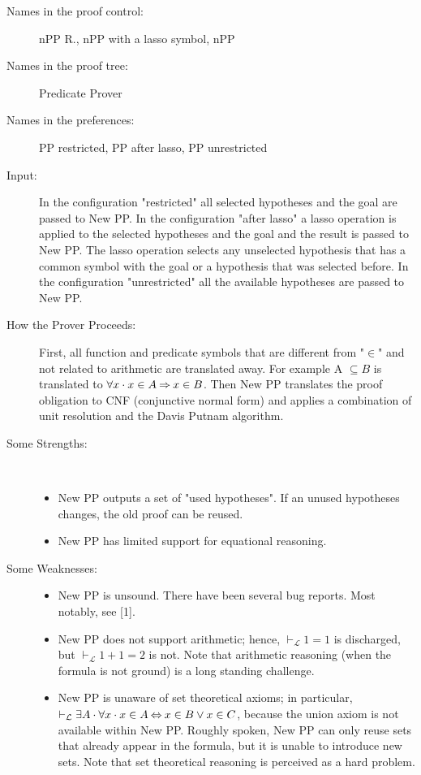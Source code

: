 \begin{description}
	\item[Names in the proof control:] nPP R., nPP with a lasso symbol, nPP
	\item[Names in the proof tree:] Predicate Prover
	\item[Names in the preferences:] PP restricted, PP after lasso, PP unrestricted
	\item[Input:] In the configuration "restricted" all selected hypotheses and the goal are passed to New PP. In the configuration "after lasso" a lasso operation is applied to the selected hypotheses and the goal and the result is passed to New PP. The lasso operation selects any unselected hypothesis that has a common symbol with the goal or a hypothesis that was selected before. In the configuration "unrestricted" all the available hypotheses are passed to New PP.
	\item[How the Prover Proceeds:] First, all function and predicate symbols that are different from "$\in$" and not related to arithmetic are translated away. For example A $\subseteq B$ is translated to $\forall x\cdot x \in A \mathbin\Rightarrow x \in B$. Then New PP translates the proof obligation to CNF (conjunctive normal form) and applies a combination of unit resolution and the Davis Putnam algorithm.
	\item[Some Strengths:] ~
	\begin{itemize}
		\item New PP outputs a set of "used hypotheses". If an unused hypotheses changes, the old proof can be reused.
		\item New PP has limited support for equational reasoning. 
	\end{itemize}
	\item[Some Weaknesses:]
	\begin{itemize}
		\item New PP is unsound. There have been several bug reports. Most notably, see [1].
		\item New PP does not support arithmetic; hence, $\vdash_{\mathcal L} 1=1$ is discharged, but $\vdash_{\mathcal L} 1+1=2$ is not. Note that arithmetic 	reasoning (when the formula is not ground) is a long standing challenge.
		\item New PP is unaware of set theoretical axioms; in particular, $\vdash_{\mathcal L} \exists A\cdot \forall x\cdot x \in A \mathbin\Leftrightarrow x \in B \lor x \in C$, because the union axiom is not available within New PP. Roughly spoken, New PP can only reuse sets that already appear in the formula, but it is unable to introduce new sets. Note that set theoretical reasoning is perceived as a hard problem.

\end{itemize}
\end{description}
